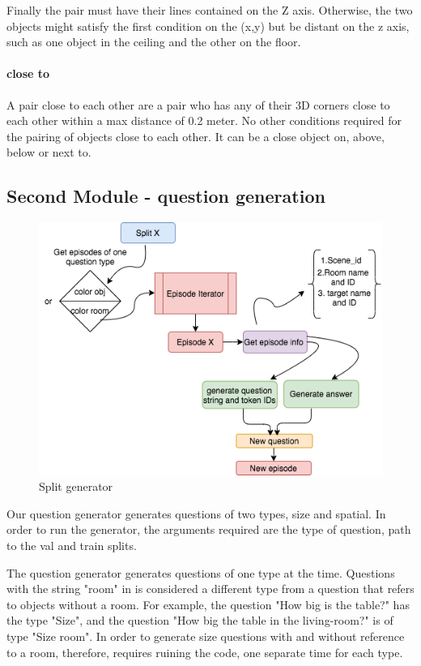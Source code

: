 Finally the pair must have their lines contained on the Z axis. Otherwise, the two objects might satisfy the first condition on the (x,y) but be distant on the z axis, such as one object in the ceiling and the other on the floor. 


\paragraph{close to}

A pair close to each other are a pair who has any of their 3D corners close to each other within a max distance of 0.2 meter. No other conditions required for the pairing of objects close to each other. It can be a close object on, above, below or next to. 

\subsection{Second Module - question generation}


\begin{figure}[H]
\includegraphics[scale=0.5]{images/generator.png}
\caption{Split generator}
\label{fig:generator}
\end{figure}



 Our question generator generates questions of two types, size and spatial. In order to run the generator, the arguments required are the type of question, path to the val and train splits. 


 The question generator generates questions of one type at the time. Questions with the string "room" in is considered a different type from a question that refers to objects without a room. For example, the question "How big is the table?" has the type "Size", and the question "How big the table in the living-room?" is of type "Size room". In order to generate size questions with and without reference to a room, therefore, requires ruining the code, one separate time for each type. 


